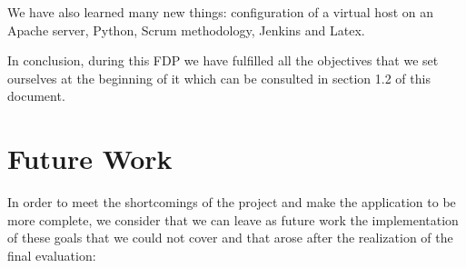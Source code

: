 We have also learned many new things: configuration of a virtual host on an Apache server, Python, Scrum methodology, Jenkins and Latex.

In conclusion, during this FDP we have fulfilled all the objectives that we set ourselves at the beginning of it which can be consulted in section 1.2 of this document.

\section{Future Work}
\label{cap12:sec:trabajo futuro}

In order to meet the shortcomings of the project and make the application to be more complete, we consider that we can leave as future work the implementation of these goals that we could not cover and that arose after the realization of the final evaluation:

